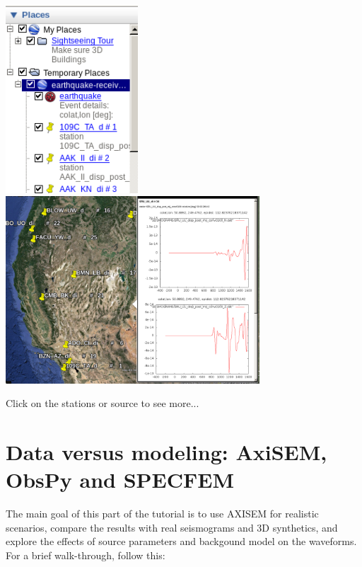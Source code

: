 \documentclass{article}
\begin{document}
\begin{enumerate}
    \begin{center}
    \includegraphics[height=70mm]{google-earth.png}
    \hspace{5mm}
    \includegraphics[height=70mm]{google-earth2.png}
    \end{center}

    Click on the stations or source to see more...

\end{enumerate}



\newpage

\section{Data versus modeling: AxiSEM, ObsPy and SPECFEM}
The main goal of this part of the tutorial is to use AXISEM for realistic scenarios, 
compare the results with real seismograms and 3D synthetics, and 
explore the effects of source parameters and backgound model on the waveforms. 
For a brief walk-through, follow this: \\
\end{document}

